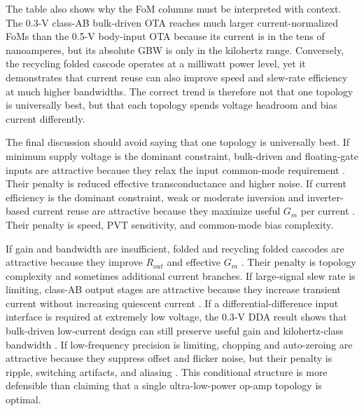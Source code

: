 \documentclass[conference,a4paper]{IEEEtran}
\begin{document}
The table also shows why the FoM columns must be interpreted with context. The 0.3-V class-AB bulk-driven OTA reaches much larger current-normalized FoMs than the 0.5-V body-input OTA because its current is in the tens of nanoamperes, but its absolute GBW is only in the kilohertz range. Conversely, the recycling folded cascode operates at a milliwatt power level, yet it demonstrates that current reuse can also improve speed and slew-rate efficiency at much higher bandwidths. The correct trend is therefore not that one topology is universally best, but that each topology spends voltage headroom and bias current differently.

The final discussion should avoid saying that one topology is universally best. If minimum supply voltage is the dominant constraint, bulk-driven and floating-gate inputs are attractive because they relax the input common-mode requirement \cite{chatterjee2005halfvolt,ramirez2004qfg}. Their penalty is reduced effective transconductance and higher noise. If current efficiency is the dominant constraint, weak or moderate inversion and inverter-based current reuse are attractive because they maximize useful $G_m$ per current \cite{silveira1996gmid,nauta1992transconductor,rodovalho2020inverter}. Their penalty is speed, PVT sensitivity, and common-mode bias complexity.

If gain and bandwidth are insufficient, folded and recycling folded cascodes are attractive because they improve $R_{out}$ and effective $G_m$ \cite{assaad2009rfc}. Their penalty is topology complexity and sometimes additional current branches. If large-signal slew rate is limiting, class-AB output stages are attractive because they increase transient current without increasing quiescent current \cite{kulej2020classab}. If a differential-difference input interface is required at extremely low voltage, the 0.3-V DDA result shows that bulk-driven low-current design can still preserve useful gain and kilohertz-class bandwidth \cite{khateb2019dda}. If low-frequency precision is limiting, chopping and auto-zeroing are attractive because they suppress offset and flicker noise, but their penalty is ripple, switching artifacts, and aliasing \cite{enz1996offset}. This conditional structure is more defensible than claiming that a single ultra-low-power op-amp topology is optimal.
\end{document}
